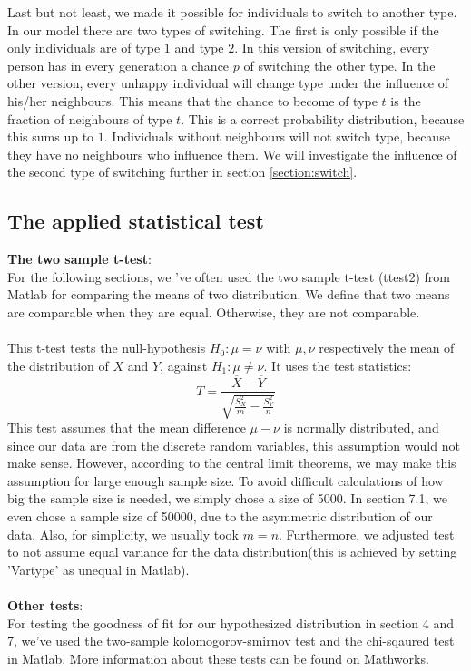 Last but not least, we made it possible for individuals to switch to another type.
In our model there are two types of switching.
The first is only possible if the only individuals are of type $1$ and type $2$.
In this version of switching, every person has in every generation a chance $p$ of switching the other type.
In the other version, every unhappy individual will change type under the influence of his/her neighbours.
This means that the chance to become of type $t$ is the fraction of neighbours of type $t$.
This is a correct probability distribution, because this sums up to $1$.
Individuals without neighbours will not switch type, because they have no neighbours who influence them.
We will investigate the influence of the second type of switching further in section \ref{section:switch}.
\subsection{The applied statistical test}
\textbf{The two sample t-test}:\\
For the following sections, we 've often used the two sample t-test (ttest2) from Matlab for comparing the means of two distribution. We define that two means are comparable when they are equal. Otherwise, they are not comparable.\\
\\
This t-test tests the null-hypothesis $H_0:\mu=\nu$ with $\mu,\nu$ respectively the mean of the distribution of $X$ and $Y$, against $H_1:\mu\neq\nu$. It uses the test statistics:
 \[T=\frac{\overline{X}-\overline{Y}}{\sqrt{\frac{S^2_X}{m}-\frac{S^2_Y}{n}}}\]
This test assumes that the mean difference $\mu-\nu$ is normally distributed, and since our data are from the discrete random variables, this assumption would not make sense. 
However, according to the central limit theorems, we may make this assumption for large enough sample size. 
To avoid difficult calculations of how big the sample size is needed, we simply chose a size of 5000. In section 7.1, we even chose a sample size of 50000, due to the asymmetric distribution of our data. Also, for simplicity, we usually took $m=n$. Furthermore, we adjusted test to not assume equal variance for the data distribution(this is achieved by setting 'Vartype' as unequal in Matlab).\\
\\
\textbf{Other tests}:\\
For testing the goodness of fit for our hypothesized distribution in section 4 and 7, we've used the two-sample kolomogorov-smirnov test and the chi-sqaured test in Matlab. More information about these tests can be found on Mathworks.  


